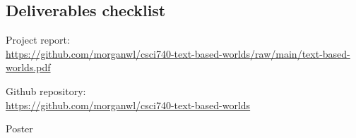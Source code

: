 
\newcommand{\cmark}{\ding{51}}
\newcommand{\xmark}{\ding{55}}
\newcommand{\done}{%
    \rlap{$\square$}{\raisebox{2pt}{\large\hspace{1pt}\cmark}}%
    \hspace{-2.5pt}}

\subsection*{Deliverables checklist}

\begin{todolist}
    \item[\done] Project report:\\
        {\small
        \url{https://github.com/morganwl/csci740-text-based-worlds/raw/main/text-based-worlds.pdf}}
    \item[\done]
        Github repository:\\
        {\small
        \url{https://github.com/morganwl/csci740-text-based-worlds}}
    \item Poster
\end{todolist}

